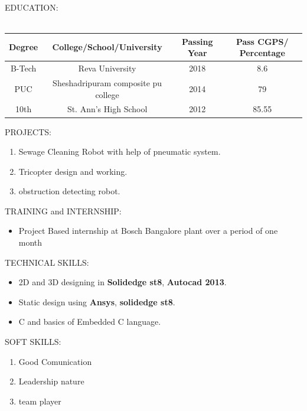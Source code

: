 \documentclass[14pt,a4paper]{article}
\begin{document}
\begin{paragraph}{\large EDUCATION:\\}
\hfill\\
\begin{tabular}{| c | c | c | c |}
\hline
\textbf{Degree} & \textbf{College/School/University} & \textbf{ Passing Year} & \textbf{ Pass CGPS/ Percentage}\\
\hline
B-Tech & Reva University & 2018 & 8.6\\
\hline
PUC & Sheshadripuram composite pu college & 2014 & 79 \\
\hline
10th & St. Ann's High School & 2012 & 85.55\\
\hline
\end{tabular}
\end{paragraph}

\begin{paragraph}{\large PROJECTS:\\}
\begin{enumerate}
\item Sewage Cleaning Robot with help of pneumatic system.
\item Tricopter design and working.
\item obstruction detecting robot.
\end{enumerate}
\end{paragraph}


\begin{paragraph}{\large TRAINING and INTERNSHIP:\\}
\begin{itemize}
\item Project Based internship at Bosch Bangalore plant over a period of one month\\
\end{itemize}
\end{paragraph}

\begin{paragraph}{\large TECHNICAL SKILLS:\\}
\begin{itemize}
\item 2D and 3D designing in \textbf{Solidedge st8}, \textbf{Autocad 2013}.
\item Static design using  \textbf{Ansys}, \textbf{solidedge st8}.
\item C and basics of Embedded C language.
\end{itemize}
\end{paragraph}

\begin{paragraph}{\large SOFT SKILLS:\\}
\begin{enumerate}
\item Good Comunication 
\item Leadership nature
\item team player
\end{enumerate}
\end{paragraph}
\end{document}
